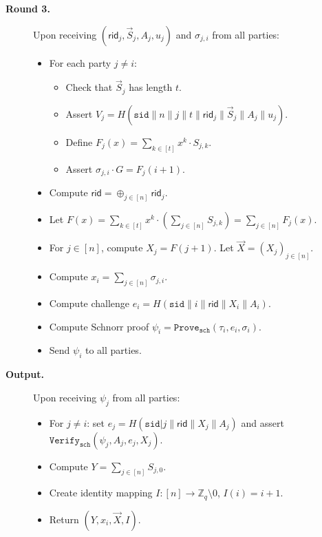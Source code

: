 \documentclass[11pt]{article}
\newcommand{\sid}{\ensuremath{\mathtt{sid}}}
\newcommand{\prove}[1]{\ensuremath{\mathtt{Prove}_{\mathtt{#1}}}}
\newcommand{\verify}[1]{\ensuremath{\mathtt{Verify}_{\mathtt{#1}}}}
\newcommand{\rid}{\textsf{rid}}
\newcommand{\Z}{\mathbb{Z}}
\newcommand{\?}[1]{\stackrel{?}{#1}}
\begin{document}
\begin{description}
  \item[\textbf{Round 3.}] 
Upon receiving $(\rid_j, \vec{S}_j, A_j, u_j)$ and $\sigma_{j,i}$ from all parties:
    \begin{itemize}
      \item For each party $j \neq i$:
        \begin{itemize}
        \item Check that $\vec{S}_j$ has length $t$.
          \item Assert $V_j = H(\sid\| n\| j\| t\| \rid_j\| \vec{S}_j\| A_j\| u_j)$.
        \item Define 
        $F_j(x) = \sum_{k \in [t]} x^k \cdot S_{j,k}$.
          \item Assert $\sigma_{j,i} \cdot G  = F_j(i + 1)$.
        \end{itemize}
      \item Compute $\rid = \oplus_{j \in [n]} \rid_j$.
      \item Let $F(x) = \sum_{k \in [t]} x^k \cdot \left(\sum_{j\in [n]} S_{j,k}\right) = \sum_{j \in [n]} F_j(x)$. 
         \item   For $j \in [n]$, compute
            $X_j = F(j + 1)$. 
            Let $\vec{X} = (X_j)_{j \in [n]}$.
      \item Compute $x_i = \sum_{j \in [n]} \sigma_{j,i}$.
      \item Compute challenge $e_i = H(\sid\| i\| \rid\| X_i\| A_i)$.
      \item Compute Schnorr proof $\psi_i = \prove{sch}(\tau_i, e_i, \sigma_i)$.
      \item Send $\psi_i$ to all parties.
    \end{itemize}

  \item[\textbf{Output.}] 
  Upon receiving $\psi_j$ from all parties:
    \begin{itemize}
      \item For $j \neq i$:
      set $e_j = H(\sid| j\| \rid\| X_j\| A_j)$ and 
      assert $\verify{sch}(\psi_j, A_j, e_j, X_j)$.
      \item Compute $Y = \sum_{j \in [n]} S_{j,0}$.
      \item Create identity mapping $I : [n] \to \Z_q \setminus 0$,
        $I(i) = i + 1$.
      \item Return $(Y, x_i, \vec{X}, I)$.
    \end{itemize}

\end{description}
\end{document}
